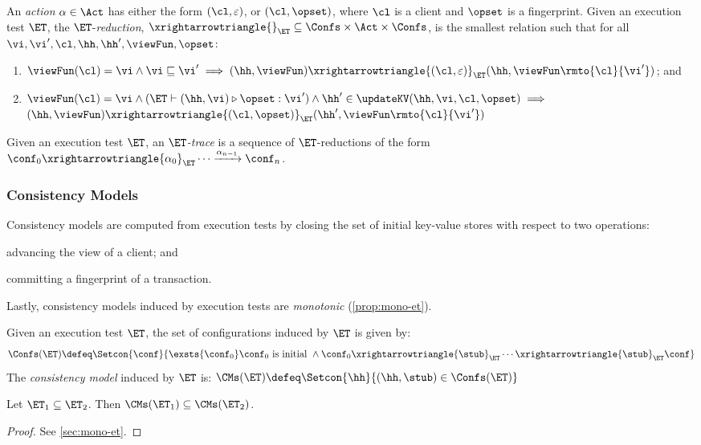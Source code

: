 \begin{definition}[$\ET$-reductions]
\label{def:reduction}
An \emph{action} $\alpha \in \Act$ has either the form $(\cl, \varepsilon)$, 
or $(\cl, \opset)$, 
where $\cl$ is a client and $\opset$ is a fingerprint. 
Given an execution test $\ET$, the $\ET$-\emph{reduction}, 
$\xrightarrowtriangle{}_{\ET} \subseteq \Confs \times \Act \times \Confs$, 
is the smallest relation such that for all $\vi, \vi', \cl, \hh, \hh', \viewFun, \opset$:
\begin{enumerate}
	\item 
    $
    \viewFun(\cl) = \vi 
    \wedge \vi \sqsubseteq \vi' 
    \implies (\hh, \viewFun) \xrightarrowtriangle{(\cl, \varepsilon)}_{\ET} 
    (\hh, \viewFun\rmto{\cl}{\vi'})$; and
	\item 
    $\viewFun(\cl) = \vi
        \wedge (\ET \vdash (\hh, \vi) \triangleright \opset: \vi')  
        \wedge \hh' \in \updateKV(\hh, \vi, \cl, \opset) \implies
	$  \\
	\phantom{a} \hfill 
	$(\hh, \viewFun) \xrightarrowtriangle{(\cl, \opset)}_{\ET} (\hh', \viewFun\rmto{\cl}{\vi'})$
\end{enumerate}
%
Given an execution test $\ET$, an \emph{$\ET$-trace} is a sequence of $\ET$-reductions of the form $\conf_{0} \xrightarrowtriangle{\alpha_{0}}_{\ET} \cdots 
\xrightarrow{\alpha_{n-1}} \conf_{n}$.
\end{definition}
%
%
%
%
\subsubsection{Consistency Models}
Consistency models are computed from execution tests by closing the set of initial key-value stores with respect to two operations: 
\begin{enumerate*}[label=(\arabic*)]
	\item advancing the view of a client; and 
	\item committing a fingerprint of a transaction. 
\end{enumerate*}
Lastly, consistency models induced by execution tests are \emph{monotonic} (\cref{prop:mono-et}).
%
%
\begin{definition}
\label{def:cm}
Given an execution test $\ET$, the set of configurations induced by $\ET$ is given by:
\[
\Confs(\ET) \defeq \Setcon{ \conf}{ \exsts{\conf_0} \conf_0 \text{ is initial } \wedge \conf_0 \xrightarrowtriangle{\stub}_{\ET} \cdots \xrightarrowtriangle{\stub}_{\ET} \conf }
\]
The \emph{consistency model} induced by $\ET$ is:
\( 
\CMs(\ET) \defeq \Setcon{ \hh }{ (\hh, \stub) \in \Confs(\ET) }
\)
\end{definition}




\begin{proposition}
\label{prop:mono-et}
Let $\ET_1 \subseteq \ET_2$. Then $\CMs(\ET_1) \subseteq \CMs(\ET_2)$.
\end{proposition}
\begin{proof}
    \ifTechReport
    
    \else
    See \cref{sec:mono-et}.
    \fi
\end{proof}
